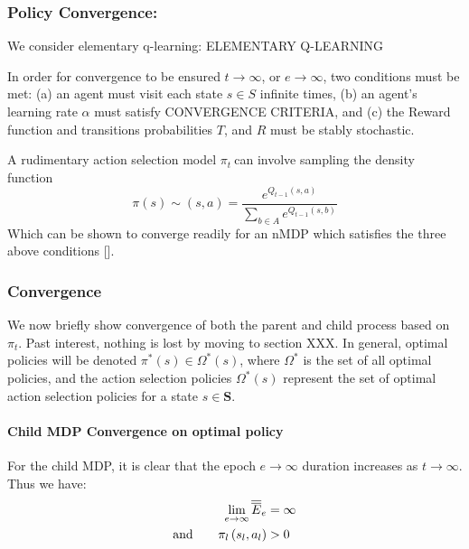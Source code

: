 \documentclass[compsoc,journal,letterpaper,10pt,draftclsnofoot,onecolumn]{IEEEtran}
\let\oldparagraph\paragraph
\renewcommand{\paragraph}[1]{\oldparagraph{#1}\mbox{}}
\begin{document}
\subsubsection{Policy Convergence:}\label{policy-convergence}

We consider elementary q-learning: ELEMENTARY Q-LEARNING

In order for convergence to be ensured \(t \rightarrow \infty\), or
\(e \rightarrow \infty\), two conditions must be met: (a) an agent must
visit each state \(s \in S\) infinite times, (b) an agent's learning
rate \(\alpha\) must satisfy CONVERGENCE CRITERIA, and (c) the Reward
function and transitions probabilities \(T\), and \(R\) must be stably
stochastic.

A rudimentary action selection model \(\pi_{t}\ \)can involve sampling
the density function
\begin{equation}
\pi\left( s \right) \sim \left( s, a \right) = \frac{e^{Q_{t - 1}(s, a)}}{\sum_{b \in A}e^{Q_{t - 1}(s, b)}}
\end{equation}
Which can be shown to converge readily for an nMDP which satisfies the
three above conditions {[}{]}.

\subsubsection{Convergence}\label{convergence}

We now briefly show convergence of both the parent and child process
based on \(\pi_{t}\). Past interest, nothing is lost by moving to
section XXX. In general, optimal policies will be denoted
\(\pi^{*}(s) \in \Omega^{*}(s)\), where \(\Omega^{*}\) is the set of all
optimal policies, and the action selection policies \(\Omega^{*}(s)\)
represent the set of optimal action selection policies for a state
\(s \in \mathbf{S}\).

\paragraph{Child MDP Convergence on optimal
policy}\label{child-mdp-convergence-on-optimal-policy}

For the child MDP, it is clear that the epoch \(e \rightarrow \infty\)
duration increases as \(t \rightarrow \infty\). Thus we have:
\begin{align}
\lim_{e\rightarrow\infty}
\overline{\overline{E}}_{e} &= \infty \notag\\ 
\textrm{and}\qquad
\pi_{l}\left( s_{l}, a_{l} \right) &> 0
\end{align} 
\end{document}
